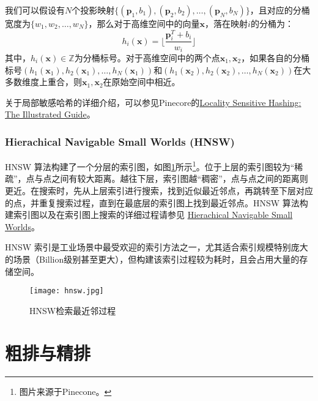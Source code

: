我们可以假设有$N$个投影映射$\{(\bm{p}_1,b_1),(\bm{p}_2,b_2),\dots,(\bm{p}_N, b_N)\}$，且对应的分桶宽度为$\{w_1,w_2,\dots,w_N\}$，那么对于高维空间中的向量$\bm{x}$，落在映射$i$的分桶为：
\begin{equation}
  h_i(\bm{x})= \lfloor \frac{\bm{p}_i^T + b_i}{w_i} \rfloor
\end{equation}
其中，$h_i(\bm{x})\in \mathbb{Z}$为分桶标号。对于高维空间中的两个点$\bm{x}_1,\bm{x}_2$，如果各自的分桶标号$(h_1(\bm{x}_1), h_2(\bm{x}_1),\dots,h_N(\bm{x}_1))$和$(h_1(\bm{x}_2), h_2(\bm{x}_2),\dots,h_N(\bm{x}_2))$在大多数维度上重合，则$\bm{x}_1,\bm{x}_2$在原始空间中相近。

\begin{note}
  关于局部敏感哈希的详细介绍，可以参见Pinecore的\href{https://www.pinecone.io/learn/series/faiss/locality-sensitive-hashing/}{Locality Sensitive Hashing: The Illustrated Guide}。
\end{note}

\subsubsection{Hierachical Navigable Small Worlds (HNSW)}

HNSW 算法构建了一个分层的索引图，如图\ref{fig:hnsw}所示\footnote{图片来源于Pinecone。}。位于上层的索引图较为“稀疏”，点与点之间有较大距离。越往下层，索引图越“稠密”，点与点之间的距离则更近。在搜索时，先从上层索引进行搜索，找到近似最近邻点，再跳转至下层对应的点，并重复搜索过程，直到在最底层的索引图上找到最近邻点。HNSW 算法构建索引图以及在索引图上搜索的详细过程请参见 \href{https://www.pinecone.io/learn/series/faiss/hnsw/}{Hierachical Navigable Small Worlds}。

HNSW 索引是工业场景中最受欢迎的索引方法之一，尤其适合索引规模特别庞大的场景（Billion级别甚至更大），但构建该索引过程较为耗时，且会占用大量的存储空间。

\begin{figure}[htbp]
  \centering
  \texttt{[image: hnsw.jpg]}
  \caption{HNSW检索最近邻过程 \label{fig:hnsw}}
\end{figure}


\section{粗排与精排}